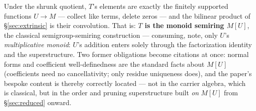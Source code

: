 Under the shrunk quotient, $T$'s elements are exactly the finitely supported functions $U \to M$ --- collect like terms, delete zeros --- and the bilinear product of §\ref{sec:extrinsic} is their convolution. That is: \textbf{$T$ is the monoid semiring $M[U]$}, the classical semigroup-semiring construction \cite{golan1999semirings} --- consuming, note, only $U$'s \emph{multiplicative monoid}: $U$'s addition enters solely through the factorization identity and the superstructure. Two former obligations become citations at once: normal forms and coefficient well-definedness are the standard facts about $M[U]$ (coefficients need no cancellativity; only residue uniqueness does), and the paper's bespoke content is thereby correctly located --- not in the carrier algebra, which is classical, but in the order and pruning superstructure built \emph{on} $M[U]$ from §\ref{sec:reduced} onward.

